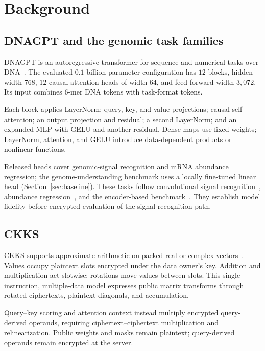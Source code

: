 
\section{Background}

\subsection{DNAGPT and the genomic task families}
DNAGPT is an autoregressive transformer for sequence and numerical tasks over DNA~\cite{dnagpt2023}.
The evaluated $0.1$-billion-parameter configuration has $12$ blocks, hidden width $768$, $12$
causal-attention heads of width $64$, and feed-forward width $3{,}072$. Its input combines
$6$-mer DNA tokens with task-format tokens.

Each block applies LayerNorm; query, key, and value projections; causal self-attention; an output
projection and residual; a second LayerNorm; and an expanded MLP with GELU and another residual.
Dense maps use fixed weights; LayerNorm, attention, and GELU introduce data-dependent products or
nonlinear functions.

Released heads cover genomic-signal recognition and mRNA abundance regression; the
genome-understanding benchmark uses a locally fine-tuned linear head (Section~\ref{sec:baseline}).
These tasks follow convolutional signal recognition~\cite{deepgsr}, abundance
regression~\cite{xpresso}, and the encoder-based benchmark~\cite{dnabert2}. They establish model
fidelity before encrypted evaluation of the signal-recognition path.

\subsection{CKKS}
CKKS supports approximate arithmetic on packed real or complex vectors~\cite{ckks2017}. Values
occupy plaintext slots encrypted under the data owner's key. Addition and multiplication act
slotwise; rotations move values between slots. This single-instruction, multiple-data model
expresses public matrix transforms through rotated ciphertexts, plaintext diagonals, and accumulation.

Query--key scoring and attention context instead multiply encrypted query-derived operands,
requiring ciphertext--ciphertext multiplication and relinearization. Public weights and masks
remain plaintext; query-derived operands remain encrypted at the server.

